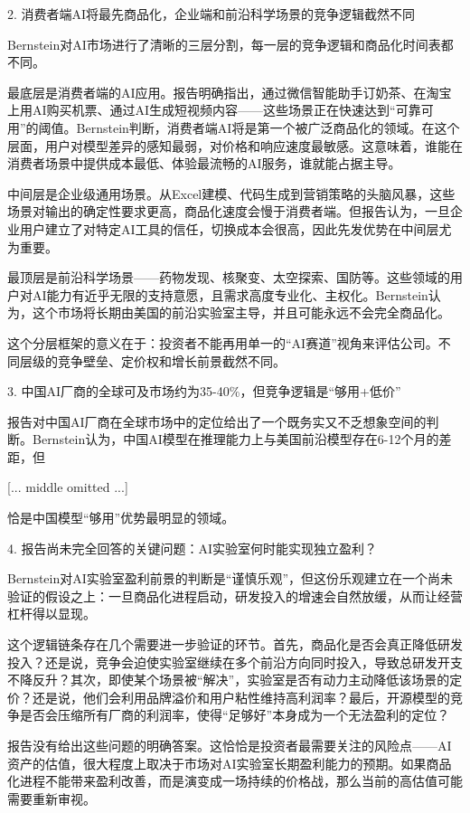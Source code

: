 \documentclass[11pt]{ctexart}
\begin{document}
2. 消费者端AI将最先商品化，企业端和前沿科学场景的竞争逻辑截然不同

Bernstein对AI市场进行了清晰的三层分割，每一层的竞争逻辑和商品化时间表都不同。

最底层是消费者端的AI应用。报告明确指出，通过微信智能助手订奶茶、在淘宝上用AI购买机票、通过AI生成短视频内容——这些场景正在快速达到“可靠可用”的阈值。Bernstein判断，消费者端AI将是第一个被广泛商品化的领域。在这个层面，用户对模型差异的感知最弱，对价格和响应速度最敏感。这意味着，谁能在消费者场景中提供成本最低、体验最流畅的AI服务，谁就能占据主导。

中间层是企业级通用场景。从Excel建模、代码生成到营销策略的头脑风暴，这些场景对输出的确定性要求更高，商品化速度会慢于消费者端。但报告认为，一旦企业用户建立了对特定AI工具的信任，切换成本会很高，因此先发优势在中间层尤为重要。

最顶层是前沿科学场景——药物发现、核聚变、太空探索、国防等。这些领域的用户对AI能力有近乎无限的支持意愿，且需求高度专业化、主权化。Bernstein认为，这个市场将长期由美国的前沿实验室主导，并且可能永远不会完全商品化。

这个分层框架的意义在于：投资者不能再用单一的“AI赛道”视角来评估公司。不同层级的竞争壁垒、定价权和增长前景截然不同。

3. 中国AI厂商的全球可及市场约为35-40\%，但竞争逻辑是“够用+低价”

报告对中国AI厂商在全球市场中的定位给出了一个既务实又不乏想象空间的判断。Bernstein认为，中国AI模型在推理能力上与美国前沿模型存在6-12个月的差距，但

[... middle omitted ...]

恰是中国模型“够用”优势最明显的领域。

4. 报告尚未完全回答的关键问题：AI实验室何时能实现独立盈利？

Bernstein对AI实验室盈利前景的判断是“谨慎乐观”，但这份乐观建立在一个尚未验证的假设之上：一旦商品化进程启动，研发投入的增速会自然放缓，从而让经营杠杆得以显现。

这个逻辑链条存在几个需要进一步验证的环节。首先，商品化是否会真正降低研发投入？还是说，竞争会迫使实验室继续在多个前沿方向同时投入，导致总研发开支不降反升？其次，即使某个场景被“解决”，实验室是否有动力主动降低该场景的定价？还是说，他们会利用品牌溢价和用户粘性维持高利润率？最后，开源模型的竞争是否会压缩所有厂商的利润率，使得“足够好”本身成为一个无法盈利的定位？

报告没有给出这些问题的明确答案。这恰恰是投资者最需要关注的风险点——AI资产的估值，很大程度上取决于市场对AI实验室长期盈利能力的预期。如果商品化进程不能带来盈利改善，而是演变成一场持续的价格战，那么当前的高估值可能需要重新审视。
\end{document}
